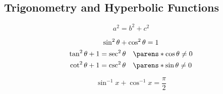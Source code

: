 \subsection{Trigonometry and Hyperbolic Functions}%
\label{sub:trigonometry-and-hyperbolic}

\begin{multicols}{2}

    \begin{CheatsheetEntryFrame}


        \begin{equation*}
            a^2 = b^2 + c^2
        \end{equation*}

        \begin{gather*}
            \sin^2{\theta} + \cos^2{\theta} = 1 \\
            \tan^2{\theta} + 1 = \sec^2{\theta}
                \quad \parens*{\cos{\theta} \ne 0} \\
            \cot^2{\theta} + 1 = \csc^2{\theta}
                \quad \parens*{\sin{\theta} \ne 0}
        \end{gather*}

        \begin{equation*}
            \sin^{-1}{x} + \cos^{-1}{x} = \frac{\pi}{2}
        \end{equation*}


\end{CheatsheetEntryFrame}
\end{multicols}
